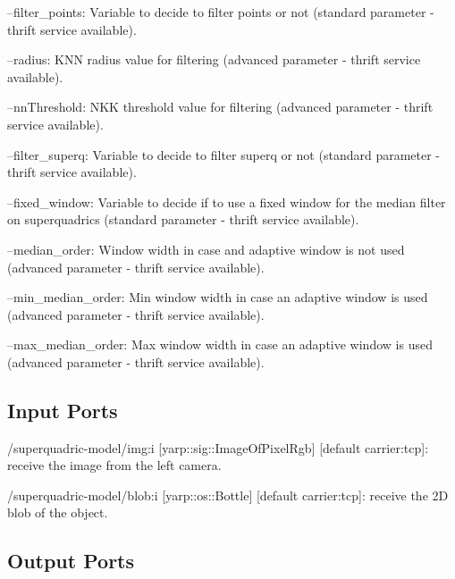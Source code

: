 \begin{DoxyItemize}
\item --filter\-\_\-points\-: Variable to decide to filter points or not (standard parameter -\/ thrift service available).
\item --radius\-: K\-N\-N radius value for filtering (advanced parameter -\/ thrift service available).
\item --nn\-Threshold\-: N\-K\-K threshold value for filtering (advanced parameter -\/ thrift service available).
\item --filter\-\_\-superq\-: Variable to decide to filter superq or not (standard parameter -\/ thrift service available).
\item --fixed\-\_\-window\-: Variable to decide if to use a fixed window for the median filter on superquadrics (standard parameter -\/ thrift service available).
\item --median\-\_\-order\-: Window width in case and adaptive window is not used (advanced parameter -\/ thrift service available).
\item --min\-\_\-median\-\_\-order\-: Min window width in case an adaptive window is used (advanced parameter -\/ thrift service available).
\item --max\-\_\-median\-\_\-order\-: Max window width in case an adaptive window is used (advanced parameter -\/ thrift service available). 
\end{DoxyItemize}\hypertarget{group__superquadric-model_inputports_sec}{}\subsection{Input Ports}\label{group__superquadric-model_inputports_sec}

\begin{DoxyItemize}
\item /superquadric-\/model/img\-:i \mbox{[}yarp\-::sig\-::\-Image\-Of\-Pixel\-Rgb\mbox{]} \mbox{[}default carrier\-:tcp\mbox{]}\-: receive the image from the left camera.
\item /superquadric-\/model/blob\-:i \mbox{[}yarp\-::os\-::\-Bottle\mbox{]} \mbox{[}default carrier\-:tcp\mbox{]}\-: receive the 2\-D blob of the object.
\end{DoxyItemize}\hypertarget{group__superquadric-model_outputports_sec}{}\subsection{Output Ports}\label{group__superquadric-model_outputports_sec}

